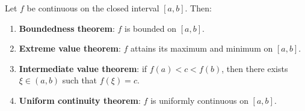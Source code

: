 \begin{theorem}\label{thm:continuous_closed_interval}
Let $f$ be continuous on the closed interval $[a,b]$. Then:
\begin{enumerate}[label=(\roman*)]
    \item \textbf{Boundedness theorem}: $f$ is bounded on $[a,b]$.
    \item \textbf{Extreme value theorem}: $f$ attains its maximum and minimum on $[a,b]$.
    \item \textbf{Intermediate value theorem}: if $f(a) < c < f(b)$, then there exists $\xi \in (a,b)$ such that $f(\xi) = c$.
    \item \textbf{Uniform continuity theorem}: $f$ is uniformly continuous on $[a,b]$.
\end{enumerate}
\end{theorem}

